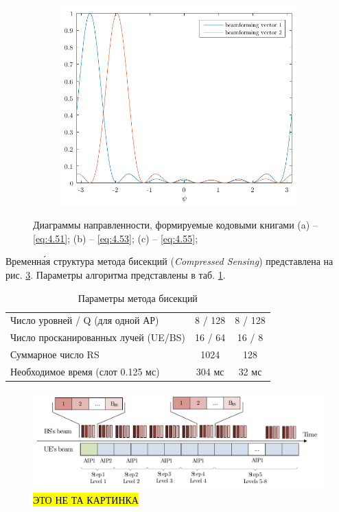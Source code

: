 \begin{figure}[ht!]
\begin{subfigure}{0.49\linewidth}
    \centering
    \includegraphics[width=\linewidth]{figs/fig4.22}
    \caption{}
    \label{fig:4.22}
\end{subfigure}
\caption{Диаграммы направленности, формируемые кодовыми книгами 
(a) -- \eqref{eq:4.51};
(b) -- \eqref{eq:4.53};
(c) -- \eqref{eq:4.55};
}
\label{fig:4.21-full}
\end{figure}

Временн\'{а}я структура метода бисекций (\textit{Compressed Sensing}) представлена на рис. \ref{fig:4.23}.
Параметры алгоритма представлены в таб. \ref{tab:4.5}.
\begin{table}[H]
    \centering
    \caption{Параметры метода бисекций}
    \label{tab:4.5}
    \begin{tabular}{lcc}
        \toprule
        \midrule
        Число уровней / Q (для одной АР)              & 8 / 128 & 8 / 128 \\
        Число просканированных \newline лучей (UE/BS) & 16 / 64 & 16 / 8  \\
        Суммарное число RS                            & 1024    & 128     \\
        Необходимое время (слот 0.125 мс)             & 304 мс  & 32 мс   \\
        \bottomrule
    \end{tabular}
\end{table}
\begin{figure}[H]
    \centering
    \includegraphics[width=\linewidth]{figs/fig4.23}
    \caption{\hl{ЭТО НЕ ТА КАРТИНКА}}
    \label{fig:4.23}
\end{figure}
